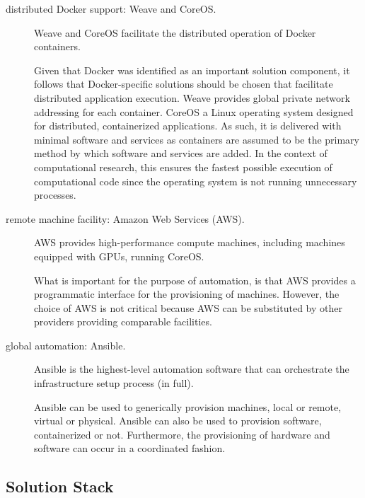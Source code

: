 \begin{description}
\item[distributed \textsf{Docker} support: \textsf{Weave} and \textsf{CoreOS}.]
%
\textsf{Weave} and \textsf{CoreOS} facilitate the distributed operation of \textsf{Docker} containers.

Given that \textsf{Docker} was identified as an important solution component, it follows that \textsf{Docker}-specific solutions should be chosen that facilitate distributed application execution.
%
\textsf{Weave} provides global private network addressing for each container.
%
\textsf{CoreOS} a \textsf{Linux} operating system designed for distributed, containerized applications.
%
As such, it is delivered with minimal software and services as containers are assumed to be the primary method by which software and services are added.
%
In the context of computational research, this ensures the fastest possible execution of computational code since the operating system is not running unnecessary processes.

\item[remote machine facility: \textsf{Amazon Web Services (AWS)}.] 
  \textsf{AWS} provides high-performance compute machines, including machines equipped with GPUs, running \textsf{CoreOS}.
  

  What is important for the purpose of automation, is that \textsf{AWS} provides a programmatic interface for the provisioning of machines.
  However, the choice of \textsf{AWS} is not critical because \textsf{AWS} can be substituted by other providers providing comparable facilities.
 


\item[global automation: \textsf{Ansible}.]
  \textsf{Ansible} is the highest-level automation software that can orchestrate the infrastructure setup process (in full).
  
  \textsf{Ansible} can be used to generically provision machines, local or remote, virtual or physical.
  \textsf{Ansible} can also be used to provision software, containerized or not.
  Furthermore, the provisioning of hardware and software can occur in a coordinated fashion.



\end{description}


\subsection{Solution Stack}
\label{sec:stack}


